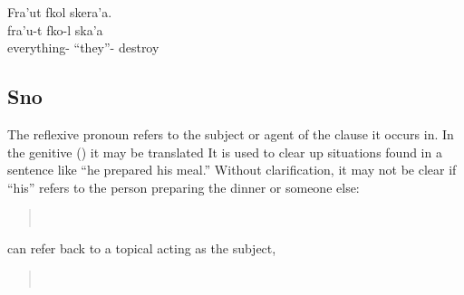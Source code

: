 \begin{interlin}
\glll Fra'ut fkol skera'a. \\
      fra'u-t fko-l ska'a \\
      everything- ``they''- destroy \\
 \Ifilm{}
\end{interlin}

\subsection{Sno} 
The reflexive pronoun  refers to the subject or agent of the
clause it occurs in.  In the genitive () it may be
translated   It is used to clear
up situations found in a sentence like ``he prepared his meal.''
Without clarification, it may not be clear if ``his'' refers to the
person preparing the dinner or someone else:

\begin{quotation}
\noindent{} \\
\noindent{} 
\end{quotation}

\noindent {} can refer back to a topical acting as the subject,

\begin{quotation}
\noindent{}\\
\indent{}
\end{quotation}

%


